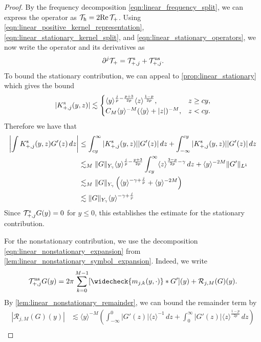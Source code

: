 \documentclass[11pt]{amsart}
\theoremstyle{definition}
\theoremstyle{remark}
\numberwithin{equation}{section}
\newcommand{\mc}[1]{\mathcal{#1}}
\newcommand{\ang}[1]{\langle #1 \rangle}
\begin{document}
\begin{proof}
    By the frequency decomposition \eqref{eqn:linear_frequency_split}, we can express the operator as $\mc{T}_{\textup{h}} = 2 \text{Re} \, \mc{T}_{+}$. Using \eqref{eqn:linear_positive_kernel_representation}, \eqref{eqn:linear_stationary_kernel_split}, and \eqref{eqn:linear_stationary_operators}, we now write the operator and its derivatives as
    \[\partial^j \mc{T}_{+} = \mc{T}_{+,j}^{\textup{s}} + \mc{T}_{+,j}^{\textup{ns}}.\]
    To bound the stationary contribution, we can appeal to \cref{prop:linear_stationary} which gives the bound
    \[|K_{+,j}^{\textup{s}}(y, z)| \lesssim \begin{cases}
        \ang{y}^{\frac{j}{p} - \frac{p + 3}{2p}} \ang{z}^{\frac{1 - p}{2p}}, & z \geq cy,\\
        C_M\ang{y}^{-M}(\ang{y} + |z|)^{-M}, & z < cy.
    \end{cases}\]
    Therefore we have that 
    \begin{equation}\label{eqn:linear_positive_stationary_contribution}
        \begin{aligned}
            \left|\int K_{+,j}^{\textup{s}}(y, z)G'(z)\,dz\right| & \leq \int_{cy}^{\infty}|K_{+,j}^{\textup{s}}(y, z)||G'(z)|\,dz + \int_{-\infty}^{cy}|K_{+,j}^{\textup{s}}(y, z)||G'(z)|\,dz \\
            & \lesssim_M \|G\|_{Y_\gamma}\ang{y}^{\frac{j}{p}-\frac{p+3}{2p}}\int_{cy}^{\infty}\ang{z}^{\frac{3-p}{2p}-\gamma}\,dz + \ang{y}^{-2M}\|G'\|_{L^1} \\
            & \lesssim_M \|G\|_{Y_\gamma}\left(\ang{y}^{-\gamma+\frac{j}{p}} + \ang{y}^{-2M}\right) \\
            & \lesssim \|G\|_{Y_\gamma}\ang{y}^{-\gamma+\frac{j}{p}}
        \end{aligned}
    \end{equation}
    Since $\mc{T}_{+,j}^{\textup{s}}G(y) = 0$ for $y \leq 0$, this establishes the estimate for the stationary contribution.
    \par
    For the nonstationary contribution, we use the decomposition \eqref{eqn:linear_nonstationary_expansion} from \cref{lem:linear_nonstationary_symbol_expansion}. Indeed, we write
    \[\mc{T}_{+,j}^{\textup{ns}}G(y) = 2\pi\sum_{k = 0}^{M-1} [\widecheck{m_{j,k}(y, \cdot)} * G'](y) + \mc{R}_{j,M}(G)(y).\]
    By \cref{lem:linear_nonstationary_remainder}, we can bound the remainder term by
    \begin{align*}
        |\mc{R}_{j,M}(G)(y)| & \lesssim \ang{y}^{-M} \left(\int_{-\infty}^{0}|G'(z)|\ang{z}^{-1} \, dz + \int_{0}^{\infty}|G'(z)|\ang{z}^{\frac{1-p}{2p}} \, dz \right)\\

\end{align*}
\end{proof}
\end{document}

